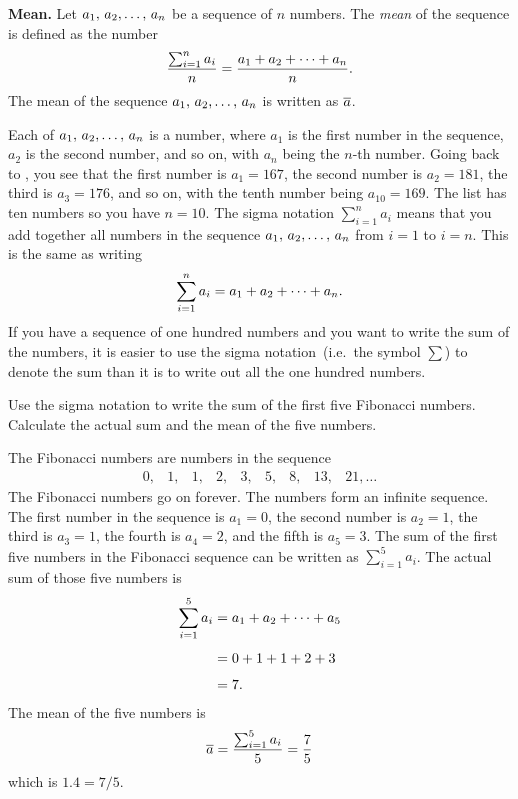 \documentclass[a4paper,oneside,12pt]{article}
\begin{document}
\begin{definition}
\textbf{Mean.}
Let ${a_1},\, {a_2}, \dots,\, {a_n}$ be a sequence of $n$ numbers.  The
\emph{mean} of the sequence is defined as the number
\[
\frac{
  \sum_{i=1}^n a_i
}{
  n
}
=
\frac{
  {a_1} + {a_2} + \cdots + {a_n}
}{
  n
}.
\]
The mean of the sequence ${a_1},\, {a_2}, \dots,\, {a_n}$ is written as $\overline{a}$.
\end{definition}

Each of ${a_1},\, {a_2}, \dots,\, {a_n}$ is a number, where $a_1$ is the first
number in the sequence, $a_2$ is the second number, and so on, with
$a_n$ being the $n$-th number.  Going back to
, you see that the first number
is $a_1 = 167$, the second number is $a_2 = 181$, the third is
$a_3 = 176$, and so on, with the tenth number being $a_{10} = 169$.
The list has ten numbers so you have $n = 10$.  The sigma notation
$\sum_{i=1}^n a_i$ means that you add together all numbers in the
sequence ${a_1},\, {a_2}, \dots,\, {a_n}$ from $i = 1$ to $i = n$.  This is the
same as writing
\[
\sum_{i=1}^n a_i
=
{a_1} + {a_2} + \cdots + {a_n}.
\]
If you have a sequence of one hundred numbers and you want to write
the sum of the numbers, it is easier to use the sigma
notation~(i.e.~the symbol $\sum$) to denote the sum than it is to
write out all the one hundred numbers.

\begin{example}
Use the sigma notation to write the sum of the first five Fibonacci
numbers.  Calculate the actual sum and the mean of the five numbers.
\end{example}

\begin{solution}
The Fibonacci numbers are numbers in the sequence
\[
\begin{matrix}
0, & 1, & 1, & 2, & 3, & 5, & 8, & 13, & 21, \dots
\end{matrix}
\]
The Fibonacci numbers go on forever.  The numbers form an infinite
sequence.  The first number in the sequence is $a_1 = 0$, the second
number is $a_2 = 1$, the third is $a_3 = 1$, the fourth is $a_4 = 2$,
and the fifth is $a_5 = 3$.  The sum of the first five numbers in the
Fibonacci sequence can be written as $\sum_{i=1}^5 a_i$.  The actual
sum of those five numbers is
\begin{align*}
\sum_{i=1}^5 a_i
&=
{a_1} + {a_2} + \cdots + {a_5} \\[4pt]
&=
0 + 1 + 1 + 2 + 3 \\[4pt]
&=
7.
\end{align*}
The mean of the five numbers is
\[
\overline{a}
=
\frac{
  \sum_{i=1}^5 a_i
}{
  5
}
=
\frac{7}{5}
\]
which is $1.4 = 7 / 5$.
\end{solution}
\end{document}
